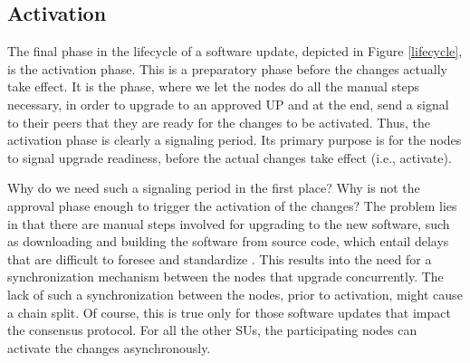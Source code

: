 \subsection{Activation}

The final phase in the lifecycle of a software update, depicted in Figure \ref{lifecycle}, is the activation phase. This is a preparatory phase before the changes actually take effect. It is the phase, where we let the nodes do all the manual steps necessary, in order to upgrade to an approved UP and at the end, send a signal to their peers that they are ready for the changes to be activated. Thus, the activation phase is clearly a signaling period. Its primary purpose is for the nodes to signal upgrade readiness, before the actual changes take effect (i.e., activate). 

Why do we need such a signaling period in the first place? Why is not the approval phase enough to trigger the activation of the changes? The problem lies in that there are manual steps involved for upgrading to the new software, such as downloading and building the software from source code, which entail delays that are difficult to foresee and standardize . This results into the need for a synchronization mechanism between the nodes that upgrade concurrently. The lack of such a synchronization between the nodes, prior to activation, might cause a chain split. Of course, this is true only for those software updates that impact the consensus protocol. For all the other SUs, the participating nodes can activate the changes asynchronously. %


